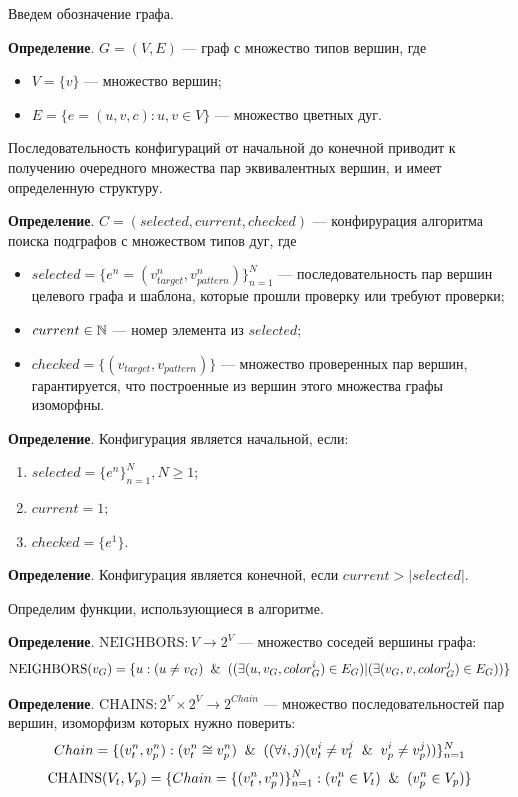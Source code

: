 Введем обозначение графа.

\textbf{Определение}. $G = ( V, E )$ --- граф с множество типов вершин, где
\begin{itemize}
\item $V = \{ v \}$ --- множество вершин;
\item $E = \{ e = (u, v, c) :  u, v \in V \}$ --- множество цветных дуг.
\end{itemize}

Последовательность конфигураций от начальной до конечной приводит к получению
очередного множества пар эквивалентных вершин, и имеет определенную структуру.

\textbf{Определение}. $C = ( selected, current, checked )$ --- конфирурация
алгоритма поиска подграфов с множеством типов дуг, где
\begin{itemize}
\item $selected = \{ e^n = ( v^n_{target}, v^n_{pattern} ) \}_{n=1}^N$ ---
последовательность пар вершин целевого графа и шаблона, которые прошли проверку
или требуют проверки;
\item $current \in \mathbb{N}$ --- номер элемента из $selected$;
\item $checked = \{ ( v_{target}, v_{pattern} ) \}$ --- множество проверенных
пар вершин, гарантируется, что построенные из вершин этого множества графы
изоморфны.
\end{itemize}

\textbf{Определение}. Конфигурация является начальной, если:
\begin{enumerate}
\item $selected = \{ e^n \}_{n=1}^N, N \ge 1$;
\item $current = 1$;
\item $checked = \{ e^1 \}$.
\end{enumerate}

\textbf{Определение}. Конфигурация является конечной, если $current > |selected|$.

Определим функции, использующиеся в алгоритме.

\textbf{Определение}. $\textrm{NEIGHBORS} : V \to 2^V$ --- множество соседей вершины графа:
%
$$\textrm{NEIGHBORS}(v_G) = \{ u : (u \ne v_G) \And ( ( \exists (u, v_G, color^i_G) \in E_G ) | ( \exists (v_G, v, color^j_G) \in E_G ) ) \}$$

\textbf{Определение}. $\textrm{CHAINS} : 2^V \times 2^V \to 2^{Chain}$ --- множество последовательностей пар вершин, изоморфизм которых нужно поверить:
%
$$Chain = \{ ( v^n_{t}, v^n_{p} ) : ( v^n_{t} \cong v^n_{p} ) \And ( ( \forall i, j ) ( v^i_{t} \ne v^j_{t} \And v^i_{p} \ne v^j_{p} ) ) \}_{n = 1}^N$$
%
$$\textrm{CHAINS}(V_t, V_p) = \{ Chain = \{ ( v^n_{t}, v^n_{p} ) \}_{n = 1}^N : ( v^n_{t} \in V_t ) \And ( v^n_{p} \in V_p ) \}$$

